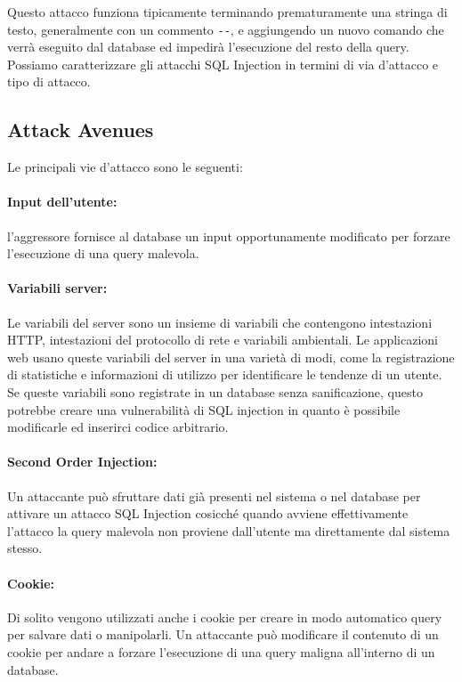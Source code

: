 Questo attacco funziona tipicamente terminando prematuramente una stringa di
testo, generalmente con un commento \verb|--|, e aggiungendo un nuovo comando
che verrà eseguito dal database ed impedirà l'esecuzione del resto della query.\\

Possiamo caratterizzare gli attacchi SQL Injection in termini di via d'attacco e
tipo di attacco.

\subsection{Attack Avenues}

Le principali vie d'attacco sono le seguenti:

\paragraph{Input dell'utente:}
l'aggressore fornisce al database un input opportunamente modificato per
forzare l'esecuzione di una query malevola.

\paragraph{Variabili server:}
Le variabili del server sono un insieme di variabili che contengono intestazioni
HTTP, intestazioni del protocollo di rete e variabili ambientali. Le
applicazioni web usano queste variabili del server in una varietà di modi, come
la registrazione di statistiche e informazioni di utilizzo per identificare le
tendenze di un utente. Se queste variabili sono registrate in un database senza
sanificazione, questo potrebbe creare una vulnerabilità di SQL injection in
quanto è possibile modificarle ed inserirci codice arbitrario.

\paragraph{Second Order Injection:}
Un attaccante può sfruttare dati già presenti nel sistema o nel database per
attivare un attacco SQL Injection cosicché quando avviene effettivamente
l'attacco la query malevola non proviene dall'utente ma direttamente dal sistema
stesso.

\paragraph{Cookie:}
Di solito vengono utilizzati anche i cookie per creare in modo automatico query
per salvare dati o manipolarli. Un attaccante può modificare il contenuto di un
cookie per andare a forzare l'esecuzione di una query maligna all'interno di un
database.

